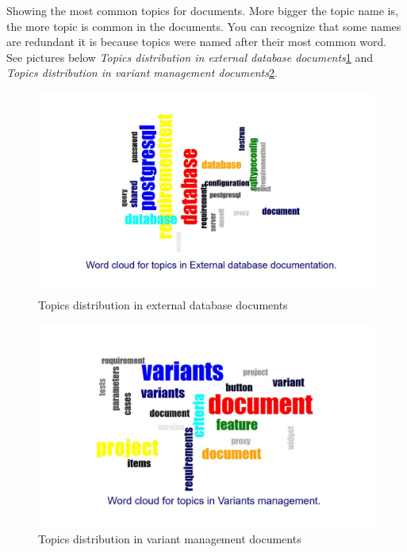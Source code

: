 \documentclass[thesis=M,english]{FITthesis}[2012/06/26]
\begin{document}
Showing the most common topics for documents. More bigger the topic name is, the more topic is common in the documents. You can recognize that some names are redundant it is because topics were named after their most common word. See pictures below \textit{Topics distribution in external database documents}\ref{fig:lda_topics_external_database} and \textit{Topics distribution in variant management documents}\ref{fig:lda_topics_vm}.\\
	   
\begin{figure}[p!]\centering
	\includegraphics[width=1\textwidth]{pictures/lda_topics_external_database}
	\caption{Topics distribution in external database documents}\label{fig:lda_topics_external_database}
\end{figure}

\begin{figure}[p!]\centering
	\includegraphics[width=1\textwidth]{pictures/lda_topics_vm}
	\caption{Topics distribution in variant management documents}\label{fig:lda_topics_vm}
\end{figure}
\end{document}
